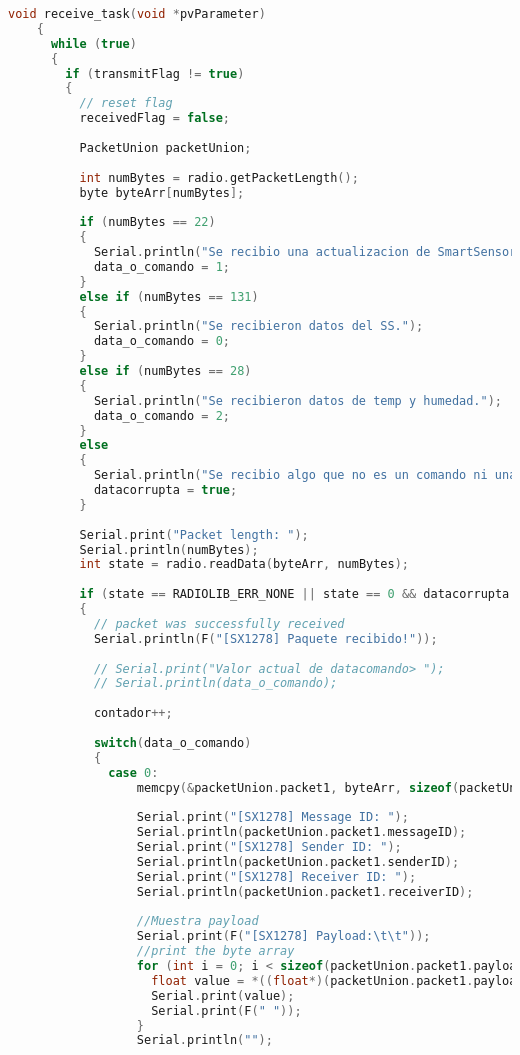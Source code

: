 
\begin{lstlisting}[language=C++, caption=Tarea de recepción de datos de aceleración vía Lora en estación base]
    void receive_task(void *pvParameter)
    {
      while (true)
      {
        if (transmitFlag != true)
        {
          // reset flag
          receivedFlag = false;
    
          PacketUnion packetUnion;
    
          int numBytes = radio.getPacketLength();
          byte byteArr[numBytes];
    
          if (numBytes == 22)
          {
            Serial.println("Se recibio una actualizacion de SmartSensor.");
            data_o_comando = 1;
          }
          else if (numBytes == 131)
          {
            Serial.println("Se recibieron datos del SS.");
            data_o_comando = 0;
          }
          else if (numBytes == 28)
          {
            Serial.println("Se recibieron datos de temp y humedad.");
            data_o_comando = 2;
          }
          else
          {
            Serial.println("Se recibio algo que no es un comando ni una actualizacion de RTC.");
            datacorrupta = true;
          }
    
          Serial.print("Packet length: ");
          Serial.println(numBytes);
          int state = radio.readData(byteArr, numBytes);
    
          if (state == RADIOLIB_ERR_NONE || state == 0 && datacorrupta == false)
          {
            // packet was successfully received
            Serial.println(F("[SX1278] Paquete recibido!"));
    
            // Serial.print("Valor actual de datacomando> ");
            // Serial.println(data_o_comando);
    
            contador++;
    
            switch(data_o_comando)
            {
              case 0:
                  memcpy(&packetUnion.packet1, byteArr, sizeof(packetUnion.packet1));
    
                  Serial.print("[SX1278] Message ID: ");
                  Serial.println(packetUnion.packet1.messageID);
                  Serial.print("[SX1278] Sender ID: ");
                  Serial.println(packetUnion.packet1.senderID);
                  Serial.print("[SX1278] Receiver ID: ");
                  Serial.println(packetUnion.packet1.receiverID);
    
                  //Muestra payload
                  Serial.print(F("[SX1278] Payload:\t\t"));
                  //print the byte array
                  for (int i = 0; i < sizeof(packetUnion.packet1.payload); i+=4) {
                    float value = *((float*)(packetUnion.packet1.payload + i));
                    Serial.print(value);
                    Serial.print(F(" "));
                  }
                  Serial.println("");
    

\end{lstlisting}
